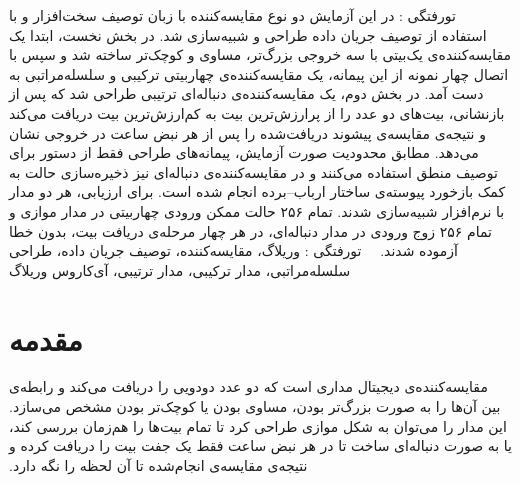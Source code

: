 \newsavebox{\dsdlcodebox}
\newenvironment{dsdlcodeblock}
{%
  \par\noindent
  \begin{latin}
  \begin{lrbox}{\dsdlcodebox}
  \begin{minipage}{0.94\linewidth}
  \small
}
{%
  \end{minipage}
  \end{lrbox}
  \setlength{\fboxsep}{6pt}
  \fcolorbox{dsdlcodeborder}{dsdlcodebg}{\usebox{\dsdlcodebox}}
  \end{latin}
  \par
}

‫%
‫%
‫%
‫
‫‌تورفتگی : در این آزمایش دو نوع مقایسه‌کننده با زبان توصیف سخت‌افزار
‫ و با استفاده از توصیف جریان داده طراحی و شبیه‌سازی شد. در بخش نخست، ابتدا
‫یک مقایسه‌کننده‌ی یک‌بیتی با سه خروجی بزرگ‌تر، مساوی و کوچک‌تر ساخته شد و سپس با اتصال
‫چهار نمونه از این پیمانه، یک مقایسه‌کننده‌ی چهاربیتی ترکیبی و سلسله‌مراتبی به دست آمد.
‫در بخش دوم، یک مقایسه‌کننده‌ی دنباله‌ای ترتیبی طراحی شد که پس از بازنشانی، بیت‌های دو عدد
‫را از پرارزش‌ترین بیت به کم‌ارزش‌ترین بیت دریافت می‌کند و نتیجه‌ی مقایسه‌ی پیشوند دریافت‌شده
‫را پس از هر نبض ساعت در خروجی نشان می‌دهد. مطابق محدودیت صورت آزمایش، پیمانه‌های طراحی
‫فقط از دستور  برای توصیف منطق استفاده می‌کنند و در مقایسه‌کننده‌ی دنباله‌ای نیز
‫ذخیره‌سازی حالت به کمک بازخورد پیوسته‌ی ساختار ارباب--برده انجام شده است. برای ارزیابی، هر
‫دو مدار با نرم‌افزار  شبیه‌سازی شدند. تمام ۲۵۶ حالت ممکن ورودی
‫چهاربیتی در مدار موازی و تمام ۲۵۶ زوج ورودی در مدار دنباله‌ای، در هر چهار مرحله‌ی دریافت بیت،
‫بدون خطا آزموده شدند.
‫
‫
‫%
‫‌تورفتگی :
‫وریلاگ، مقایسه‌کننده، توصیف جریان داده، طراحی سلسله‌مراتبی، مدار ترکیبی، مدار ترتیبی،
‫آی‌کاروس وریلاگ
‫%
‫
‫
‫\section{مقدمه}
‫
‫مقایسه‌کننده‌ی دیجیتال مداری است که دو عدد دودویی را دریافت می‌کند و رابطه‌ی بین آن‌ها را
‫به صورت بزرگ‌تر بودن، مساوی بودن یا کوچک‌تر بودن مشخص می‌سازد. این مدار را می‌توان به شکل
‫موازی طراحی کرد تا تمام بیت‌ها را هم‌زمان بررسی کند، یا به صورت دنباله‌ای ساخت تا در هر نبض
‫ساعت فقط یک جفت بیت را دریافت کرده و نتیجه‌ی مقایسه‌ی انجام‌شده تا آن لحظه را نگه دارد.
